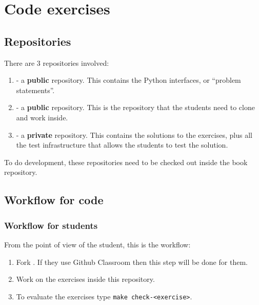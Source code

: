 
\section{Code exercises}

\subsection{Repositories}
There are 3 repositories involved:
\begin{enumerate}
    \item {} - a \textbf{public} repository.
          This contains the Python interfaces, or ``problem statements''.
    \item {} - a \textbf{public} repository.
          This is the repository that the students need to clone and work inside.
    \item {} - a \textbf{private} repository.
          This contains the solutions to the exercises, plus all the test infrastructure that allows the students to test the solution.
\end{enumerate}

To do development, these repositories need to be checked out inside the book repository.

\subsection{Workflow for code}

\subsubsection{Workflow for students}

From the point of view of the student, this is the workflow:

\begin{enumerate}
    \item Fork .
          If they use Github Classroom then this step will be done for them.
    \item Work on the exercises inside this repository.
    \item To evaluate the exercises type \texttt{make check-<exercise>}.
\end{enumerate}

